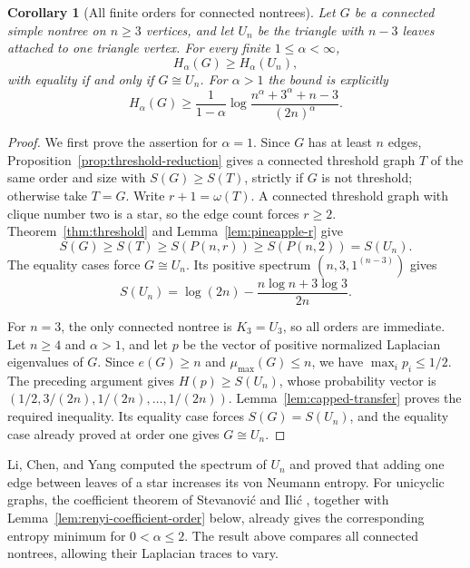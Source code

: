 \documentclass[11pt,a4paper,reqno]{amsart}
\newtheorem{corollary}[theorem]{Corollary}
\theoremstyle{remark}
\newcommand{\Ent}{S}
\newcommand{\Pine}{P}
\numberwithin{equation}{section}
\begin{document}
\begin{corollary}[All finite orders for connected nontrees]
\label{cor:nontree-all-renyi}
Let $G$ be a connected simple nontree on $n\ge3$ vertices, and let
$U_n$ be the triangle with $n-3$ leaves attached to one triangle
vertex. For every finite $1\le\alpha<\infty$,
\[
 H_\alpha(G)\ge H_\alpha(U_n),
\]
with equality if and only if $G\cong U_n$. For $\alpha>1$ the
bound is explicitly
\[
 H_\alpha(G)\ge\frac1{1-\alpha}
 \log\frac{n^\alpha+3^\alpha+n-3}{(2n)^\alpha}.
\]
\end{corollary}
\begin{proof}
We first prove the assertion for $\alpha=1$.
Since $G$ has at least $n$ edges,
Proposition~\ref{prop:threshold-reduction} gives a connected threshold
graph $T$ of the same order and size with $\Ent(G)\ge\Ent(T)$,
strictly if $G$ is not threshold; otherwise take $T=G$.
Write $r+1=\omega(T)$. A connected threshold graph with clique
number two is a star, so the edge count forces $r\ge2$.
Theorem~\ref{thm:threshold} and Lemma~\ref{lem:pineapple-r} give
\[
 \Ent(G)\ge\Ent(T)\ge\Ent(\Pine(n,r))
 \ge\Ent(\Pine(n,2))=\Ent(U_n).
\]
The equality cases force $G\cong U_n$. Its positive spectrum
$(n,3,1^{(n-3)})$ gives
\begin{equation}\label{eq:nontree-minimum-value}
 \Ent(U_n)=\log(2n)-\frac{n\log n+3\log3}{2n}.
\end{equation}

For $n=3$, the only connected nontree is $K_3=U_3$, so all orders
are immediate. Let $n\ge4$ and $\alpha>1$, and let $p$ be the vector
of positive normalized Laplacian eigenvalues of $G$. Since
$e(G)\ge n$ and $\mu_{\max}(G)\le n$, we have $\max_i p_i\le1/2$.
The preceding argument gives $H(p)\ge\Ent(U_n)$, whose probability
vector is $(1/2,3/(2n),1/(2n),\ldots,1/(2n))$.
Lemma~\ref{lem:capped-transfer} proves the required inequality.
Its equality case forces $\Ent(G)=\Ent(U_n)$, and the equality
case already proved at order one gives $G\cong U_n$.
\end{proof}

Li, Chen, and Yang \cite{LiChenYang2015} computed the spectrum of
$U_n$ and proved that adding one edge between leaves of a star
increases its von Neumann entropy. For unicyclic graphs, the
coefficient theorem of Stevanovi\'c and Ili\'c
\cite[Theorem 1.3]{StevanovicIlic2009}, together with
Lemma~\ref{lem:renyi-coefficient-order} below, already gives the
corresponding entropy minimum for $0<\alpha\le2$. The result above
compares all connected nontrees, allowing their Laplacian traces to vary.
\end{document}
